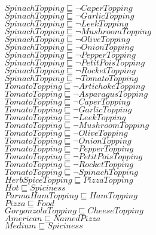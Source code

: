 \documentclass[a4paper,10pt]{article}
\begin{document}
 $SpinachTopping \sqsubseteq  \lnot CaperTopping$\\ 
 $SpinachTopping \sqsubseteq  \lnot GarlicTopping$\\ 
 $SpinachTopping \sqsubseteq  \lnot LeekTopping$\\ 
 $SpinachTopping \sqsubseteq  \lnot MushroomTopping$\\ 
 $SpinachTopping \sqsubseteq  \lnot OliveTopping$\\ 
 $SpinachTopping \sqsubseteq  \lnot OnionTopping$\\ 
 $SpinachTopping \sqsubseteq  \lnot PepperTopping$\\ 
 $SpinachTopping \sqsubseteq  \lnot PetitPoisTopping$\\ 
 $SpinachTopping \sqsubseteq  \lnot RocketTopping$\\ 
 $SpinachTopping \sqsubseteq  \lnot TomatoTopping$\\ 
 $TomatoTopping \sqsubseteq  \lnot ArtichokeTopping$\\ 
 $TomatoTopping \sqsubseteq  \lnot AsparagusTopping$\\ 
 $TomatoTopping \sqsubseteq  \lnot CaperTopping$\\ 
 $TomatoTopping \sqsubseteq  \lnot GarlicTopping$\\ 
 $TomatoTopping \sqsubseteq  \lnot LeekTopping$\\ 
 $TomatoTopping \sqsubseteq  \lnot MushroomTopping$\\ 
 $TomatoTopping \sqsubseteq  \lnot OliveTopping$\\ 
 $TomatoTopping \sqsubseteq  \lnot OnionTopping$\\ 
 $TomatoTopping \sqsubseteq  \lnot PepperTopping$\\ 
 $TomatoTopping \sqsubseteq  \lnot PetitPoisTopping$\\ 
 $TomatoTopping \sqsubseteq  \lnot RocketTopping$\\ 
 $TomatoTopping \sqsubseteq  \lnot SpinachTopping$\\ 
 $HerbSpiceTopping \sqsubseteq PizzaTopping$\\ 
 $Hot \sqsubseteq Spiciness$\\ 
 $ParmaHamTopping \sqsubseteq HamTopping$\\ 
 $Pizza \sqsubseteq Food$\\ 
 $GorgonzolaTopping \sqsubseteq CheeseTopping$\\ 
 $American \sqsubseteq NamedPizza$\\ 
 $Medium \sqsubseteq Spiciness$\\ 
\end{document}
